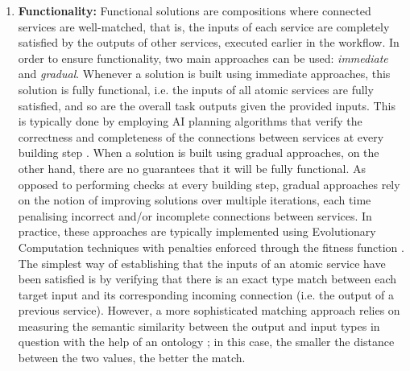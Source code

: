 \begin{enumerate}
 \item \textbf{Functionality:} Functional solutions are compositions where connected services are well-matched, that is, the inputs of each service are completely satisfied by the outputs of other services, executed earlier in the workflow. In order to ensure functionality, two main approaches can be used: \textit{immediate} and \textit{gradual}. Whenever a solution is built using immediate approaches, this solution is fully functional, i.e. the inputs of all atomic services are fully satisfied, and so are the overall task outputs given the provided inputs. This is typically done by employing AI planning algorithms that verify the correctness and completeness of the connections between services at every building step \cite{wang2014automated}. When a solution is built using gradual approaches, on the other hand, there are no guarantees that it will be fully functional. As opposed to performing checks at every building step, gradual approaches rely on the notion of improving solutions over multiple iterations, each time penalising incorrect and/or incomplete connections between services. In practice, these approaches are typically implemented using Evolutionary Computation techniques with penalties enforced through the fitness function \cite{rodriguez2010composition}. The simplest way of establishing that the inputs of an atomic service have been satisfied is by verifying that there is an exact type match between each target input and its corresponding incoming connection (i.e. the output of a previous service). However, a more sophisticated matching approach relies on measuring the semantic similarity between the output and input types in question with the help of an ontology \cite{DBLP:journals/soca/BoustilMS14}; in this case, the smaller the distance between the two values, the better the match.
 

\end{enumerate}
